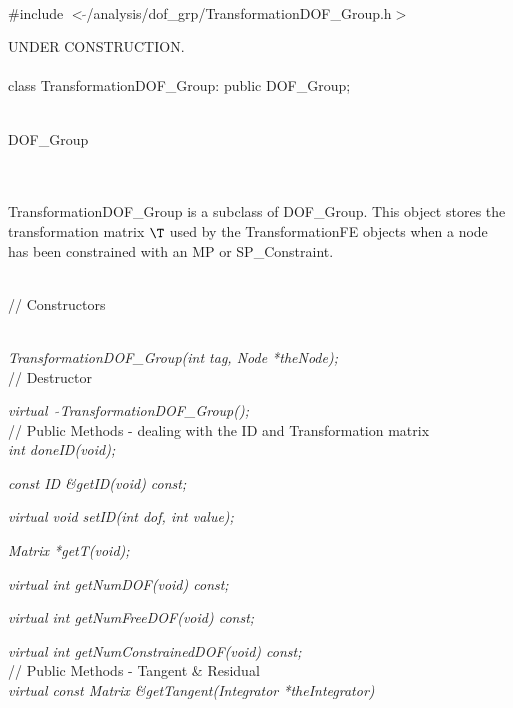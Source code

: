 
   \\
\#include $<\tilde{ }$/analysis/dof\_grp/TransformationDOF\_Group.h$>$  


UNDER CONSTRUCTION.\\

  \\
class TransformationDOF\_Group: public DOF\_Group;  



  \\
DOF\_Group 

\indent{} \\ 

  \\
\indent TransformationDOF\_Group is a subclass of DOF\_Group. This
object stores the transformation matrix $\T$ used by the
TransformationFE objects when a node has been constrained with an MP
or SP\_Constraint.


  \\
// Constructors  

  \\
{\em TransformationDOF\_Group(int tag, Node *theNode);}  \\ 

// Destructor  

{\em virtual~ $\tilde{}$TransformationDOF\_Group();}  \\

\indent // Public Methods - dealing with the ID and Transformation
matrix  \\ 
{\em    int doneID(void);    }

{\em    const ID \&getID(void) const; }

{\em    virtual void setID(int dof, int value);    }

{\em    Matrix *getT(void);}

{\em    virtual int getNumDOF(void) const;    }

{\em    virtual int getNumFreeDOF(void) const;}

{\em    virtual int getNumConstrainedDOF(void) const;}\\

\indent // Public Methods - Tangent \& Residual  \\ 
{\em virtual const Matrix \&getTangent(Integrator *theIntegrator)} 

